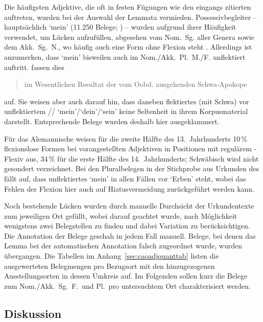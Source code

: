 Die häufigsten Adjektive, die oft in festen Fügungen wie den eingangs zitierten
auftreten, wurden bei der Auswahl der Lemmata vermieden. Possessivbegleiter --
hauptsächlich  `mein' (11.250 Belege; \cite[1231--1232]{wmu2}) --
wurden aufgrund ihrer Häufigkeit verwendet, um Lücken aufzufüllen, abgesehen
vom Nom.\ Sg. aller Genera sowie dem Akk.\ Sg.\ N., wo häufig auch eine Form
ohne Flexion steht \autocites[216]{paul2007}[507, 510--511]{ksw2}. Allerdings
ist anzumerken, dass  `mein' bisweilen auch im Nom./Akk.\ Pl.\ M./F.
unflektiert auftritt. \citet[510]{ksw2} fassen dies \blockquote{im Wesentlichen
 Resultat der vom Oobd. ausgehenden Schwa-Apokope} auf. Sie weisen
aber auch darauf hin, dass daneben flektiertes  (mit Schwa) vor
unflektiertem // `mein'/`dein'/`sein' keine
Seltenheit in ihrem Korpusmaterial darstellt. Entsprechende Belege wurden
deshalb hier ausgeklammert.

Für das Alemannische weisen \citet[271, Abbildung~A~47]{ksw2}
für die zweite Hälfte des 13.~Jahrhunderts 10\,\% flexionslose Formen bei
vorangestellten Adjektiven in Positionen mit regulärem -Flexiv aus,
34\,\% für die erste Hälfte des 14.~Jahrhunderts; Schwäbisch
wird nicht gesondert verzeichnet. Bei den Pluralbelegen in der Stichprobe aus
Urkunden des \CAO{} fällt auf, dass unflektiertes  `mein' in allen
Fällen vor  `Erben' steht, wobei das Fehlen der Flexion hier auch
auf Hiatusvermeidung zurückgeführt werden kann.

Noch bestehende Lücken wurden durch manuelle Durchsicht der Urkundentexte zum
jeweiligen Ort gefüllt, wobei darauf geachtet wurde, nach Möglichkeit
wenigstens zwei Belegstellen zu finden und dabei Variation zu berücksichtigen.
Die Annotation der Belege geschah in jedem Fall manuell. Belege, bei denen das
Lemma bei der automatischen Annotation falsch zugeordnet wurde, wurden
übergangen. Die Tabellen im Anhang~\ref{sec:caoadjquanttab} listen die
ausgewerteten Belegmengen pro Bezugsort mit den hinzugezogenen
Ausstellungs\-orten in dessen Umkreis auf. Im Folgenden sollen kurz die Belege
zum Nom./Akk.\ Sg.\ F.\ und Pl.\ pro untersuchtem Ort charakterisiert werden.

\subsection{Diskussion}
\label{subsec:cao_adjflex_disc}

